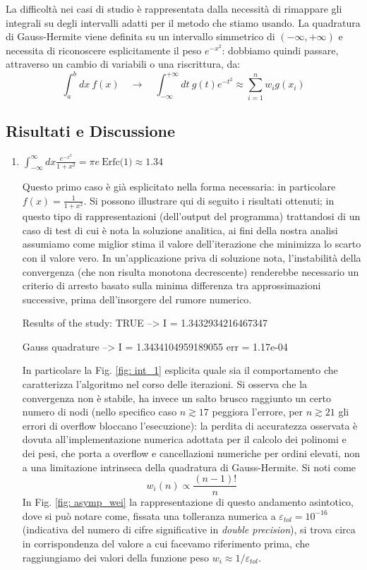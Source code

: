 La difficoltà nei casi di studio è rappresentata dalla necessità di rimappare gli integrali su degli intervalli adatti per il metodo che stiamo usando. La quadratura di Gauss-Hermite viene definita su un intervallo simmetrico di $(-\infty, +\infty)$ e necessita di riconoscere esplicitamente il peso $e^{-x^2}$: dobbiamo quindi passare, attraverso un cambio di variabili o una riscrittura, da:
\[
\int_{a}^{b} dx\ f(x) \quad \longrightarrow \quad \int_{-\infty}^{+\infty} dt\ g(t) e^{-t^2} \approx \sum_{i=1}^n w_i g(x_i)
\]



\subsection{Risultati e Discussione}
\begin{enumerate}
    \item $\int_{-\infty}^\infty dx \frac{e^{-x^2}}{1+x^2} = \pi e\ \text{Erfc(1)}\approx1.34$
    
    \medskip\noindent
    Questo primo caso è già esplicitato nella forma necessaria: in particolare $f(x) = \frac{1}{1+x^2}$.
    Si possono illustrare qui di seguito i risultati ottenuti; in questo tipo di rappresentazioni (dell'output del programma) trattandosi di un caso di test di cui è nota la soluzione analitica, ai fini della nostra analisi assumiamo come miglior stima il valore dell'iterazione che minimizza lo scarto con il valore vero. In un'applicazione priva di soluzione nota, l'instabilità della convergenza (che non risulta monotona decrescente) renderebbe necessario un criterio di arresto basato sulla minima differenza tra approssimazioni successive, prima dell'insorgere del rumore numerico.

\begin{elegantcode}
Results of the study:
     TRUE                --> I = 1.3432934216467347

     Gauss quadrature    --> I = 1.3434104959189055
                             err = 1.17e-04
\end{elegantcode}

    In particolare la Fig. \ref{fig: int_1} esplicita quale sia il comportamento che caratterizza l'algoritmo nel corso delle iterazioni. Si osserva che la convergenza non è stabile, ha invece un salto brusco raggiunto un certo numero di nodi (nello specifico caso $n\gtrsim 17$ peggiora l'errore, per $n\gtrsim 21$ gli errori di overflow bloccano l'esecuzione): la perdita di accuratezza osservata è dovuta all'implementazione numerica adottata per il calcolo dei polinomi e dei pesi, che porta a overflow e cancellazioni numeriche per ordini elevati, non a una limitazione intrinseca della quadratura di Gauss-Hermite. Si noti come
    \[
    w_i(n) \propto \frac{(n-1)!}{n} 
    \]
    In Fig. \ref{fig: asymp_wei} la rappresentazione di questo andamento asintotico, dove si può notare come, fissata una tolleranza numerica a $\varepsilon_{tol}=10^{-16}$ (indicativa del numero di cifre significative in \textit{double precision}), si trova circa in corrispondenza del valore a cui facevamo riferimento prima, che raggiungiamo dei valori della funzione peso $w_i\approx1/ \varepsilon_{tol}$. 
    

\end{enumerate}
